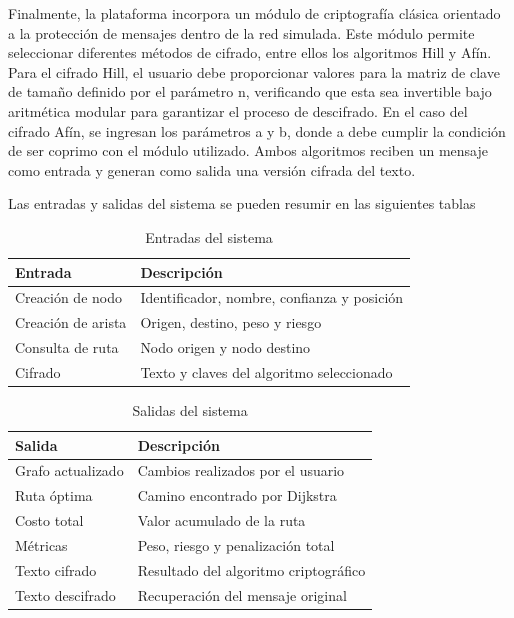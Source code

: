 \documentclass[conference]{IEEEtran}
\begin{document}
Finalmente, la plataforma incorpora un módulo de criptografía clásica orientado a la protección de mensajes dentro de la red simulada. Este módulo permite seleccionar diferentes métodos de cifrado, entre ellos los algoritmos Hill y Afín. Para el cifrado Hill, el usuario debe proporcionar valores para la matriz de clave de tamaño definido por el parámetro n, verificando que esta sea invertible bajo aritmética modular para garantizar el proceso de descifrado. En el caso del cifrado Afín, se ingresan los parámetros a y b, donde a debe cumplir la condición de ser coprimo con el módulo utilizado. Ambos algoritmos reciben un mensaje como entrada y generan como salida una versión cifrada del texto.

Las entradas y salidas del sistema se pueden resumir en las siguientes tablas

\begin{table}[H]
    \caption{Entradas del sistema}
    \label{tab:entradas}
    \centering
    \begin{tabular}{ll}
    \toprule
    \textbf{Entrada} & \textbf{Descripción} \\
    \midrule
    Creación de nodo & Identificador, nombre, confianza y posición \\
    Creación de arista & Origen, destino, peso y riesgo \\
    Consulta de ruta & Nodo origen y nodo destino \\
    Cifrado & Texto y claves del algoritmo seleccionado \\
    \bottomrule
    \end{tabular}
\end{table}


\begin{table}[H]
    \caption{Salidas del sistema}
    \label{tab:salidas}
    \centering
    \begin{tabular}{ll}
    \toprule
    \textbf{Salida} & \textbf{Descripción} \\
    \midrule
    Grafo actualizado & Cambios realizados por el usuario \\
    Ruta óptima & Camino encontrado por Dijkstra \\
    Costo total & Valor acumulado de la ruta \\
    Métricas & Peso, riesgo y penalización total \\
    Texto cifrado & Resultado del algoritmo criptográfico \\
    Texto descifrado & Recuperación del mensaje original \\
    \bottomrule
    \end{tabular}
\end{table}
\end{document}
